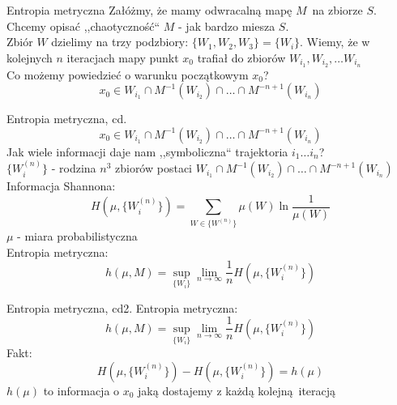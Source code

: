 \documentclass{beamer}
\begin{document}
\begin{frame}{Entropia metryczna} \pause
	Załóżmy, że mamy odwracalną mapę $M$ na zbiorze $S$.\pause \\
	Chcemy opisać ,,chaotyczność`` $M$ - jak bardzo miesza $S$.\\ \pause
	Zbiór $W$ dzielimy na trzy podzbiory: $\{W_1, W_2, W_3\} = \{W_i\}$.\pause
	Wiemy, że w kolejnych $n$ iteracjach mapy punkt $x_0$ trafiał do zbiorów
  $W_{i_1}, W_{i_2}, \dots W_{i_n}$\pause\\
	Co możemy powiedzieć o warunku początkowym $x_0$?\pause
	\begin{equation*}
		x_0 \in W_{i_1} \cap M^{-1}(W_{i_2}) \cap \dots \cap M^{-n+1}(W_{i_n})
	\end{equation*}
\end{frame}

\begin{frame}{Entropia metryczna, cd.}
	\begin{equation*}
		x_0 \in W_{i_1} \cap M^{-1}(W_{i_2}) \cap \dots \cap M^{-n+1}(W_{i_n})
	\end{equation*}
	Jak wiele informacji daje nam ,,symboliczna`` trajektoria $i_1 \dots i_n$?\\ \pause
	$\{W^{(n)}_i\}$ - rodzina $n^3$ zbiorów postaci
	$W_{i_1} \cap M^{-1}(W_{i_2}) \cap \dots \cap M^{-n+1}(W_{i_n})$ \pause \\
	Informacja Shannona:
	\begin{equation*}
		H(\mu, \{W^{(n)}_i\})=\sum_{W \in \{W^{(n)}\}}\mu(W)\ln\frac{1}{\mu(W)}
	\end{equation*}
	$\mu$ - miara probabilistyczna\\ \pause
	Entropia metryczna:
	\begin{equation*}
		h(\mu, M) = \sup_{\{W_i\}}\lim_{n\to\infty}\frac{1}{n}H(\mu, \{W_i^{(n)}\})
	\end{equation*}
\end{frame}

\begin{frame}{Entropia metryczna, cd2.}
	Entropia metryczna:
	\begin{equation*}
		h(\mu, M) = \sup_{\{W_i\}}\lim_{n\to\infty}\frac{1}{n}H(\mu, \{W_i^{(n)}\})
	\end{equation*}
	Fakt: 
	\begin{equation*}
		H(\mu, \{W^{(n)}_i\}) - H(\mu, \{W^{(n)}_i\}) = h(\mu)
	\end{equation*}
 $h(\mu)$ to informacja o $x_0$ jaką dostajemy z każdą kolejną iteracją
\end{frame}
\end{document}
